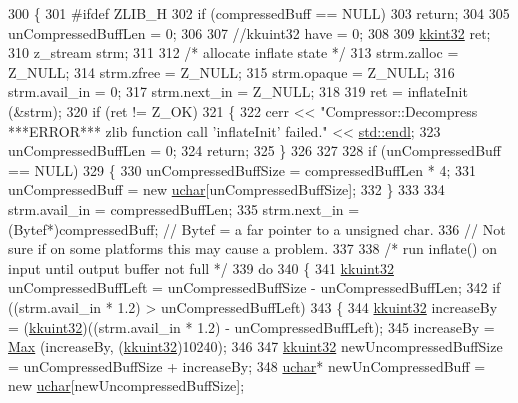 \begin{DoxyCode}
300 \{
301 \textcolor{preprocessor}{#ifdef ZLIB\_H}
302   \textcolor{keywordflow}{if}  (compressedBuff == NULL)
303     \textcolor{keywordflow}{return};
304 
305   unCompressedBuffLen = 0;
306 
307   \textcolor{comment}{//kkuint32   have      = 0;}
308 
309   \hyperlink{namespace_k_k_b_a8fa4952cc84fda1de4bec1fbdd8d5b1b}{kkint32}    ret;
310   z\_stream   strm;
311 
312   \textcolor{comment}{/* allocate inflate state */}
313   strm.zalloc   = Z\_NULL;
314   strm.zfree    = Z\_NULL;
315   strm.opaque   = Z\_NULL;
316   strm.avail\_in = 0;
317   strm.next\_in  = Z\_NULL;
318 
319   ret = inflateInit (&strm);
320   \textcolor{keywordflow}{if}  (ret != Z\_OK)
321   \{
322     cerr << \textcolor{stringliteral}{"Compressor::Decompress  ***ERROR***  zlib function call 'inflateInit'  failed."} << 
      \hyperlink{namespace_k_k_b_ad1f50f65af6adc8fa9e6f62d007818a8}{std::endl};
323     unCompressedBuffLen = 0;
324     \textcolor{keywordflow}{return};
325   \}
326 
327   
328   \textcolor{keywordflow}{if}  (unCompressedBuff == NULL)
329   \{
330     unCompressedBuffSize = compressedBuffLen * 4;
331     unCompressedBuff = \textcolor{keyword}{new} \hyperlink{namespace_k_k_b_ace9969169bf514f9ee6185186949cdf7}{uchar}[unCompressedBuffSize];
332   \}
333 
334   strm.avail\_in = compressedBuffLen;
335   strm.next\_in  = (Bytef*)compressedBuff;  \textcolor{comment}{// Bytef = a far pointer to a unsigned char.    }
336                                            \textcolor{comment}{// Not sure if on some platforms this may cause a problem.}
337 
338   \textcolor{comment}{/* run inflate() on input until output buffer not full */}
339   \textcolor{keywordflow}{do} 
340   \{
341     \hyperlink{namespace_k_k_b_af8d832f05c54994a1cce25bd5743e19a}{kkuint32}  unCompressedBuffLeft = unCompressedBuffSize - unCompressedBuffLen;
342     \textcolor{keywordflow}{if}  ((strm.avail\_in * 1.2) > unCompressedBuffLeft)
343     \{
344       \hyperlink{namespace_k_k_b_af8d832f05c54994a1cce25bd5743e19a}{kkuint32}  increaseBy = (\hyperlink{namespace_k_k_b_af8d832f05c54994a1cce25bd5743e19a}{kkuint32})((strm.avail\_in * 1.2) - unCompressedBuffLeft);
345       increaseBy = \hyperlink{namespace_k_k_b_a25e187e24c091586293725f27f007ad7}{Max} (increaseBy, (\hyperlink{namespace_k_k_b_af8d832f05c54994a1cce25bd5743e19a}{kkuint32})10240);
346 
347       \hyperlink{namespace_k_k_b_af8d832f05c54994a1cce25bd5743e19a}{kkuint32}  newUncompressedBuffSize = unCompressedBuffSize + increaseBy;
348       \hyperlink{namespace_k_k_b_ace9969169bf514f9ee6185186949cdf7}{uchar}*  newUnCompressedBuff = \textcolor{keyword}{new} \hyperlink{namespace_k_k_b_ace9969169bf514f9ee6185186949cdf7}{uchar}[newUncompressedBuffSize];

\end{DoxyCode}
